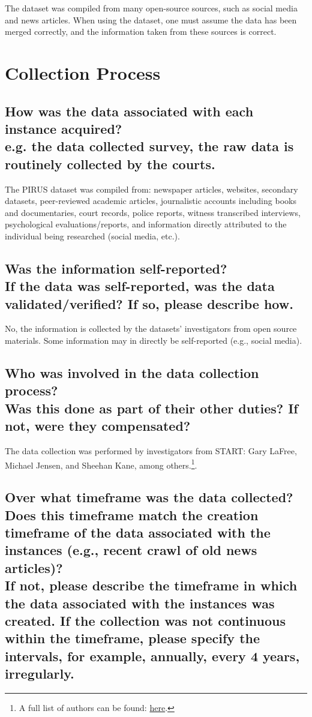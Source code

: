 \documentclass[letterpaper, 10 pt, conference]{ieeeconf}  %
\newcommand{\subtitle}[1]{{\\ \small \normalfont \color{purple} #1}}
\begin{document}
The dataset was compiled from many open-source sources, such as social media and news articles. When using the dataset, one must assume the data has been merged correctly, and the information taken from these sources is correct.

\section{Collection Process}

\subsection{How was the data associated with each instance acquired? \subtitle {e.g. the data collected survey, the raw data is routinely collected by the courts.}}

The PIRUS dataset was compiled from: newspaper articles, websites, secondary datasets, peer-reviewed academic articles, journalistic accounts including books and documentaries, court records, police reports, witness transcribed interviews, psychological evaluations/reports, and information directly attributed to the individual being researched (social media, etc.).


\subsection{Was the information self-reported? \subtitle{If the data was self-reported, was the data validated/verified? If so, please describe how.}}

No, the information is collected by the datasets' investigators from open source materials. Some information may in directly be self-reported (e.g., social media).


\subsection{Who was involved in the data collection process? \subtitle{Was this done as part of their other duties? If not, were they compensated?}}
 
The data collection was performed by investigators from START: Gary LaFree, Michael Jensen, and Sheehan Kane, among others.\footnote{A full list of authors can be found: \href{https://www.start.umd.edu/data-tools/profiles-individual-radicalization-united-states-pirus}{here}.}.

\subsection{Over what timeframe was the data collected? Does this timeframe match the creation timeframe of the data associated with the instances (e.g., recent crawl of old news articles)? \subtitle{If not, please describe the timeframe in which the data associated with the instances was created. If the collection was not continuous within the timeframe, please specify the intervals, for example, annually, every 4 years, irregularly.}}
\end{document}
